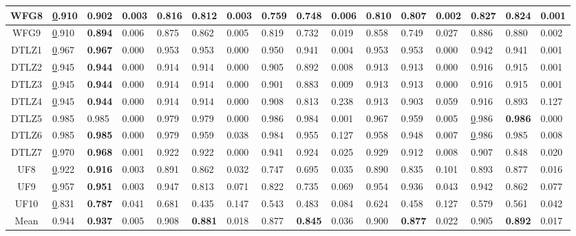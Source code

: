 \begin{table*}[t]
{\begin{scriptsize}
\begin{tabular}{c l|l|l|l|l|l|l|l|l|l|l|l|l|l|l}
\multicolumn{1}{c|}{WFG8} & {\ul 0.910} & \textbf{0.902} & 0.003 & 0.816 & 0.812 & 0.003 & 0.759 & 0.748 & 0.006 & 0.810 & 0.807 & 0.002 & 0.827 & 0.824 & 0.001 \\ \hline
\multicolumn{1}{c|}{WFG9} & {\ul 0.910} & \textbf{0.894} & 0.006 & 0.875 & 0.862 & 0.005 & 0.819 & 0.732 & 0.019 & 0.858 & 0.749 & 0.027 & 0.886 & 0.880 & 0.002 \\ \hline
\multicolumn{1}{c|}{DTLZ1} & {\ul 0.967} & \textbf{0.967} & 0.000 & 0.953 & 0.953 & 0.000 & 0.950 & 0.941 & 0.004 & 0.953 & 0.953 & 0.000 & 0.942 & 0.941 & 0.001 \\ \hline
\multicolumn{1}{c|}{DTLZ2} & {\ul 0.945} & \textbf{0.944} & 0.000 & 0.914 & 0.914 & 0.000 & 0.905 & 0.892 & 0.008 & 0.913 & 0.913 & 0.000 & 0.916 & 0.915 & 0.001 \\ \hline
\multicolumn{1}{c|}{DTLZ3} & {\ul 0.945} & \textbf{0.944} & 0.000 & 0.914 & 0.914 & 0.000 & 0.901 & 0.883 & 0.009 & 0.913 & 0.913 & 0.000 & 0.916 & 0.915 & 0.001 \\ \hline
\multicolumn{1}{c|}{DTLZ4} & {\ul 0.945} & \textbf{0.944} & 0.000 & 0.914 & 0.914 & 0.000 & 0.908 & 0.813 & 0.238 & 0.913 & 0.903 & 0.059 & 0.916 & 0.893 & 0.127 \\ \hline
\multicolumn{1}{c|}{DTLZ5} & 0.985 & 0.985 & 0.000 & 0.979 & 0.979 & 0.000 & 0.986 & 0.984 & 0.001 & 0.967 & 0.959 & 0.005 & {\ul 0.986} & \textbf{0.986} & 0.000 \\ \hline
\multicolumn{1}{c|}{DTLZ6} & 0.985 & \textbf{0.985} & 0.000 & 0.979 & 0.959 & 0.038 & 0.984 & 0.955 & 0.127 & 0.958 & 0.948 & 0.007 & {\ul 0.986} & 0.985 & 0.008 \\ \hline
\multicolumn{1}{c|}{DTLZ7} & {\ul 0.970} & \textbf{0.968} & 0.001 & 0.922 & 0.922 & 0.000 & 0.941 & 0.924 & 0.025 & 0.929 & 0.912 & 0.008 & 0.907 & 0.848 & 0.020 \\ \hline
\multicolumn{1}{c|}{UF8} & {\ul 0.922} & \textbf{0.916} & 0.003 & 0.891 & 0.862 & 0.032 & 0.747 & 0.695 & 0.035 & 0.890 & 0.835 & 0.101 & 0.893 & 0.877 & 0.016 \\ \hline
\multicolumn{1}{c|}{UF9} & {\ul 0.957} & \textbf{0.951} & 0.003 & 0.947 & 0.813 & 0.071 & 0.822 & 0.735 & 0.069 & 0.954 & 0.936 & 0.043 & 0.942 & 0.862 & 0.077 \\ \hline
\multicolumn{1}{c|}{UF10} & {\ul 0.831} & \textbf{0.787} & 0.041 & 0.681 & 0.435 & 0.147 & 0.543 & 0.483 & 0.084 & 0.624 & 0.458 & 0.127 & 0.579 & 0.561 & 0.042 \\ \hline
\multicolumn{1}{c|}{Mean} & 0.944 & \textbf{0.937} & 0.005 & 0.908 & \textbf{0.881} & 0.018 & 0.877 & \textbf{0.845} & 0.036 & 0.900 & \textbf{0.877} & 0.022 & 0.905 & \textbf{0.892} & 0.017 \\ \hline
\end{tabular}%
\end{scriptsize}
}
\end{table*}

